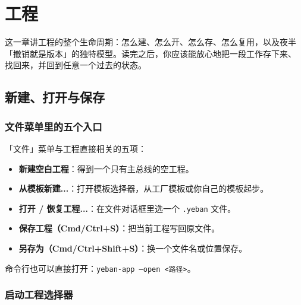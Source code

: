 
\chapter{工程}
\label{ch:projects}






这一章讲工程的整个生命周期：怎么建、怎么开、怎么存、怎么复用，以及夜半
「撤销就是版本」的独特模型。读完之后，你应该能放心地把一段工作存下来、
找回来，并回到任意一个过去的状态。

\section{新建、打开与保存}

\subsection{文件菜单里的五个入口}

「文件」菜单与工程直接相关的五项：

\begin{itemize}
  \item \textbf{新建空白工程}：得到一个只有主总线的空工程。
  \item \textbf{从模板新建...}：打开模板选择器，从工厂模板或你自己的模板起步。
  \item \textbf{打开 / 恢复工程...}：在文件对话框里选一个 \texttt{.yeban} 文件。
  \item \textbf{保存工程（Cmd/Ctrl+S）}：把当前工程写回原文件。
  \item \textbf{另存为（Cmd/Ctrl+Shift+S）}：换一个文件名或位置保存。
\end{itemize}

命令行也可以直接打开：\texttt{yeban-app --open <路径>}。


\subsection{启动工程选择器}

